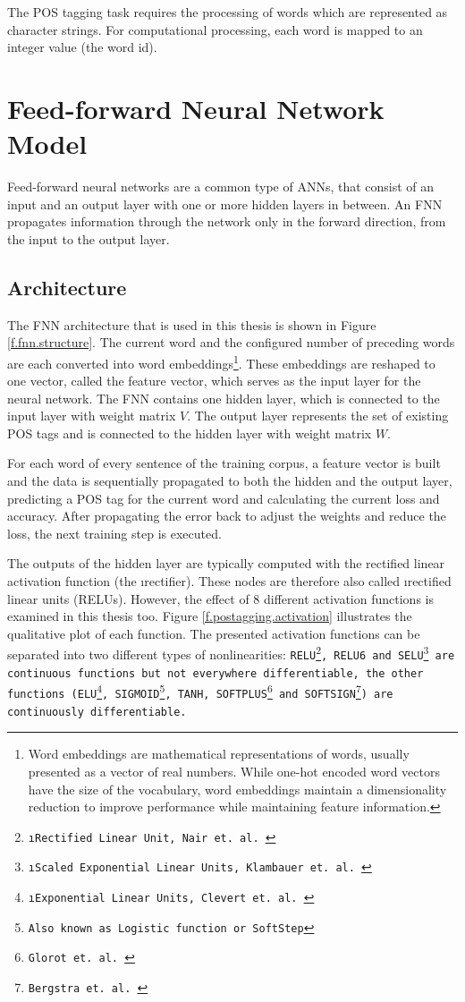 The POS tagging task requires the processing of words which are represented as character strings. For computational processing, each word is mapped to an integer value (the word id).

\section{Feed-forward Neural Network Model}\label{c.postagging.fnn}
Feed-forward neural networks are a common type of ANNs, that consist of an input and an output layer with one or more hidden layers in between. An FNN propagates information through the network only in the forward direction, from the input to the output layer.

\subsection{Architecture}\label{c.postagging.fnn.architecture}
The FNN architecture that is used in this thesis is shown in Figure \ref{f.fnn.structure}. The current word and the configured number of preceding words are each converted into word embeddings\footnote{Word embeddings are mathematical representations of words, usually presented as a vector of real numbers. While one-hot encoded word vectors have the size of the vocabulary, word embeddings maintain a dimensionality reduction to improve performance while maintaining feature information.}. These embeddings are reshaped to one vector, called the feature vector, which serves as the input layer for the neural network. The FNN contains one hidden layer, which is connected to the input layer with weight matrix $V$. The output layer represents the set of existing POS tags and is connected to the hidden layer with weight matrix $W$.

For each word of every sentence of the training corpus, a feature vector is built and the data is sequentially propagated to both the hidden and the output layer, predicting a POS tag for the current word and calculating the current loss and accuracy. After propagating the error back to adjust the weights and reduce the loss, the next training step is executed.

The outputs of the hidden layer are typically computed with the rectified linear activation function (the \i{rectifier}). These nodes are therefore also called \i{rectified linear units} (RELUs). However, the effect of 8 different activation functions is examined in this thesis too. Figure \ref{f.postagging.activation} illustrates the qualitative plot of each function. The presented activation functions can be separated into two different types of nonlinearities: \tt{RELU}\footnote{\i{Rectified Linear Unit}, Nair et. al. \cite{nair2010}}, \tt{RELU6} and \tt{SELU}\footnote{\i{Scaled Exponential Linear Units}, Klambauer et. al. \cite{klambauer2017}} are continuous functions but not everywhere differentiable, the other functions (\tt{ELU}\footnote{\i{Exponential Linear Units}, Clevert et. al. \cite{clevert2015}}, \tt{SIGMOID}\footnote{Also known as Logistic function or SoftStep}, \tt{TANH}, \tt{SOFTPLUS}\footnote{Glorot et. al. \cite{glorot2011}} and \tt{SOFTSIGN}\footnote{Bergstra et. al. \cite{bergstra2009}}) are continuously differentiable.


